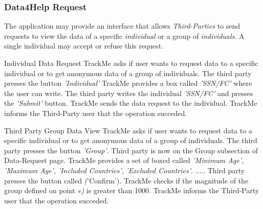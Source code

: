 \documentclass[a4paper]{article}
\begin{document}
        \subsubsection{Data4Help Request}
        The application may provide an interface that allows \textit{Third-Parties} to send requests to view the data of a specific \textit{individual} or a group of \textit{individuals}. A single individual may accept or refuse this request.
        
        \begin{usecase}{Individual Data Request}
              {TrackMe asks if user wants to request data to a specific individual or to get anonymous data of a group of individuals.}
              {The third party presses the button \textit{'Individual'} }
              {TrackMe provides a box called \textit{'SSN/FC'} where the user can write.}
              {The third party writes the individual \textit{'SSN/FC'} and presses the \textit{'Submit'} button.}
              {TrackMe sends the data request to the individual.}
              {TrackMe informs the Third-Party user that the operation succeded.}
        \end{usecase}
        
        \begin{usecase}{Third Party Group Data View}
              {TrackMe asks if user wants to request data to a specific individual or to get anonymous data of a group of individuals.}
              {The third party presses the button \textit{'Group'}. Third party is now on the Group subsection of Data-Request page.}
              {TrackMe provides a set of boxed called \textit{'Minimum Age'}, \textit{'Maximum Age'}, \textit{'Included Countries'}, \textit{'Excluded Countries'}.}
              {.....}
              {Third party presses the button called \textit('Confirm').}
              {TrackMe checks if the magnitude of the group defined on point \textit{e)} is greater than 1000.}
              {TrackMe informs the Third-Party user that the operation succeded.}
        \end{usecase}
        
\end{document}
